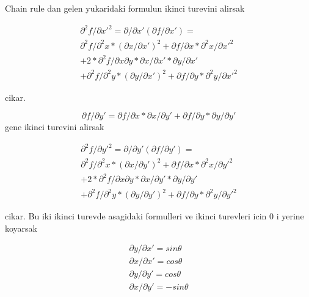 \documentclass[12pt]{article}
\begin{document}
Chain rule dan gelen yukaridaki formulun ikinci turevini alirsak

\begin{equation}
\begin{split}
\partial ^{2}f/\partial x'^{2} = \partial /\partial x'\left ( \partial f/\partial x' \right ) = \\
\partial ^{2} f / \partial ^{2}x * \left ( \partial x/\partial x' \right )^{2} + \partial f/\partial x * \partial^{2}x/\partial x'^{2}   \\
+ 2* \partial ^{2} f / \partial x\partial y * \partial x/ \partial x' * \partial y/ \partial x' \\
+ \partial ^{2} f / \partial ^{2}y * \left ( \partial y/\partial x' \right )^{2} 
+ \partial f/\partial y * \partial^{2}y/\partial x'^{2}
\end{split}
\end{equation}

cikar.

$$\partial f / \partial y' = \partial f / \partial x * \partial x / \partial y' + \partial f / \partial y * \partial y / \partial y'$$ 
  gene ikinci turevini alirsak

\begin{equation}
\begin{split}
\partial ^{2}f/\partial y'^{2} = \partial /\partial y'\left ( \partial f/\partial y' \right ) = \\
\partial ^{2} f / \partial ^{2}x * \left ( \partial x/\partial y' \right )^{2} + \partial f/\partial x * \partial^{2}x/\partial y'^{2}   \\
+ 2* \partial ^{2} f / \partial x\partial y * \partial x/ \partial y' * \partial y/ \partial y' \\
+ \partial ^{2} f / \partial ^{2}y * \left ( \partial y/\partial y' \right )^{2} 
+ \partial f/\partial y * \partial^{2}y/\partial y'^{2}
\end{split}
\end{equation}

cikar. Bu iki ikinci turevde asagidaki formulleri ve ikinci turevleri icin 0 i yerine koyarsak

\begin{equation}
\begin{split}
\partial y / \partial x' = sin\theta \\
\partial x / \partial x' = cos\theta \\
\partial y / \partial y' = cos\theta \\
\partial x / \partial y' = -sin\theta \\
\end{split}
\end{equation}
\end{document}
